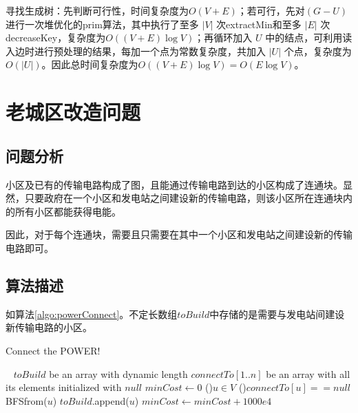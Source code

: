 \documentclass[11pt]{article}
\begin{document}
    寻找生成树：先判断可行性，时间复杂度为$O(V+E)$；若可行，先对$(G-U)$进行一次堆优化的prim算法，其中执行了至多 $|V|$ 次extractMin和至多 $|E|$ 次decreaseKey，复杂度为$O((V+E) \log V)$；再循环加入 $U$ 中的结点，可利用读入边时进行预处理的结果，每加一个点为常数复杂度，共加入 $|U|$ 个点，复杂度为$O(|U|)$。因此总时间复杂度为$O((V+E) \log V) = O(E \log V)$。


\section{老城区改造问题}
\subsection*{问题分析}
    小区及已有的传输电路构成了图，且能通过传输电路到达的小区构成了连通块。显然，只要政府在一个小区和发电站之间建设新的传输电路，则该小区所在连通块内的所有小区都能获得电能。

    因此，对于每个连通块，需要且只需要在其中一个小区和发电站之间建设新的传输电路即可。    

\subsection*{算法描述}
如算法\ref{algo:powerConnect}。不定长数组$toBuild$中存储的是需要与发电站间建设新传输电路的小区。
\begin{algorithm}
    \caption{Connect the POWER!}\label{algo:powerConnect}
    \
    \Var $toBuild$ be an array with dynamic length\;
    \Var $connectTo[1..n]$ be an array with all its elements initialized with $null$\;
    $minCost \leftarrow 0$\;
    \ForAll(){$u \in V$}{
        \If(){$connectTo[u] == null$}{
            \Call BFSfrom($u$)\;
            $toBuild.$append($u$)\;
            $minCost \leftarrow minCost + 1000e4$\;
        }
    }
\end{algorithm}
\end{document}
